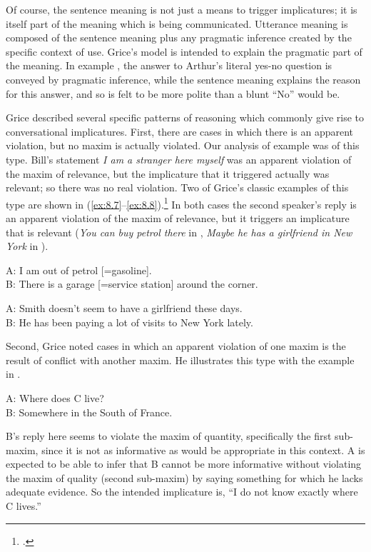 Of course, the sentence meaning is not just a means to trigger implicatures; it is itself part of the meaning which is being communicated. Utterance meaning is composed of the sentence meaning plus any pragmatic inference created by the specific context of use. Grice’s model is intended to explain the pragmatic part of the meaning. In example , the answer to Arthur’s literal yes-no question is conveyed by pragmatic inference, while the sentence meaning explains the reason for this answer, and so is felt to be more polite than a blunt “No” would be.



Grice described several specific patterns of reasoning which commonly give rise to conversational implicatures. First, there are cases in which there is an apparent violation, but no maxim is actually violated. Our analysis of example  was of this type. Bill’s statement \textit{I am a stranger here myself} was an apparent violation of the maxim of relevance, but the implicature that it triggered actually was relevant; so there was no real violation. Two of Grice’s classic examples of this type are shown in (\ref{ex:8.7}--\ref{ex:8.8}).\footnote{\citet[51]{Grice1975}.} In both cases the second speaker’s reply is an apparent violation of the maxim of relevance, but it triggers an implicature that is relevant (\textit{You can buy petrol there} in , \textit{Maybe he has a girlfriend in New York} in ).


\ea \label{ex:8.7}
A: I am out of petrol [=gasoline].\\
B: There is a garage [=service station] around the corner.
\z

\ea \label{ex:8.8}
A: Smith doesn’t seem to have a girlfriend these days.\\
B: He has been paying a lot of visits to New York lately.
\z


Second, Grice noted cases in which an apparent violation of one maxim is the result of conflict with another maxim. He illustrates this type with the example in . 


\ea \label{ex:8.9}
A: Where does C live?\\
B: Somewhere in the South of France.
\z


B’s reply here seems to violate the maxim of quantity, specifically the first sub-maxim, since it is not as informative as would be appropriate in this context. A is expected to be able to infer that B cannot be more informative without violating the maxim of quality (second sub-maxim) by saying something for which he lacks adequate evidence. So the intended implicature is, “I do not know exactly where C lives.”



